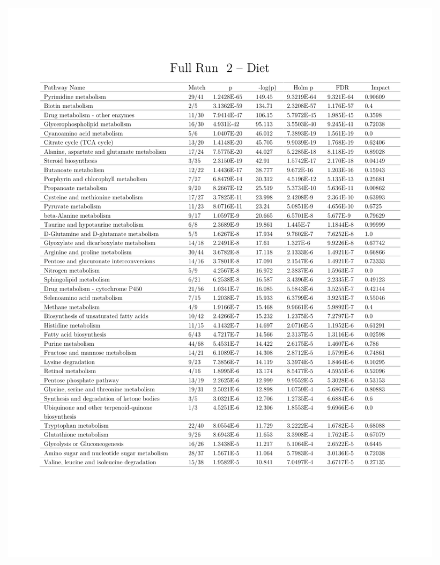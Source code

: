 \documentclass[a4paper,11pt,twoside]{book}
\begin{document}
\begin{subappendices}
\begin{figure}
	\centering
	\includegraphics[width=\linewidth]{3.Metabolomics/MSEA_charts_4.pdf}
\end{figure}


\end{subappendices}

	
\end{document}
